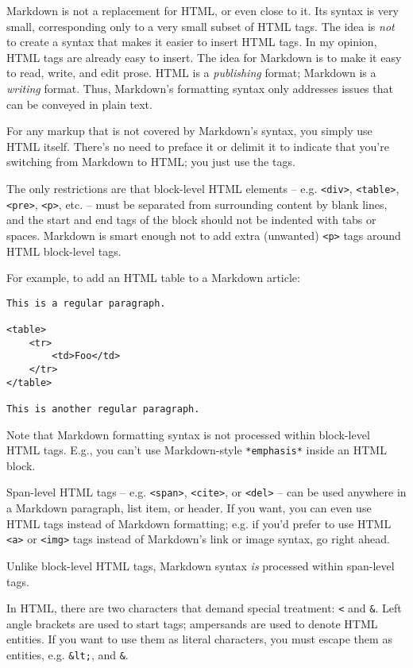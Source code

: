 Markdown is not a replacement for HTML, or even close to it. Its
syntax is very small, corresponding only to a very small subset of
HTML tags. The idea is \emph{not} to create a syntax that makes it easier
to insert HTML tags. In my opinion, HTML tags are already easy to
insert. The idea for Markdown is to make it easy to read, write, and
edit prose. HTML is a \emph{publishing} format; Markdown is a \emph{writing}
format. Thus, Markdown's formatting syntax only addresses issues that
can be conveyed in plain text.

For any markup that is not covered by Markdown's syntax, you simply
use HTML itself. There's no need to preface it or delimit it to
indicate that you're switching from Markdown to HTML; you just use
the tags.

The only restrictions are that block-level HTML elements -- e.g. \texttt{<div>},
\texttt{<table>}, \texttt{<pre>}, \texttt{<p>}, etc. -- must be separated from surrounding
content by blank lines, and the start and end tags of the block should
not be indented with tabs or spaces. Markdown is smart enough not
to add extra (unwanted) \texttt{<p>} tags around HTML block-level tags.

For example, to add an HTML table to a Markdown article:

\begin{verbatim}
This is a regular paragraph.

<table>
    <tr>
        <td>Foo</td>
    </tr>
</table>

This is another regular paragraph.
\end{verbatim}

Note that Markdown formatting syntax is not processed within block-level
HTML tags. E.g., you can't use Markdown-style \texttt{*emphasis*} inside an
HTML block.

Span-level HTML tags -- e.g. \texttt{<span>}, \texttt{<cite>}, or \texttt{<del>} -- can be
used anywhere in a Markdown paragraph, list item, or header. If you
want, you can even use HTML tags instead of Markdown formatting; e.g. if
you'd prefer to use HTML \texttt{<a>} or \texttt{<img>} tags instead of Markdown's
link or image syntax, go right ahead.

Unlike block-level HTML tags, Markdown syntax \emph{is} processed within
span-level tags.

In HTML, there are two characters that demand special treatment: \texttt{<}
and \texttt{\&}. Left angle brackets are used to start tags; ampersands are
used to denote HTML entities. If you want to use them as literal
characters, you must escape them as entities, e.g. \texttt{\&lt;}, and
\texttt{\&}.

